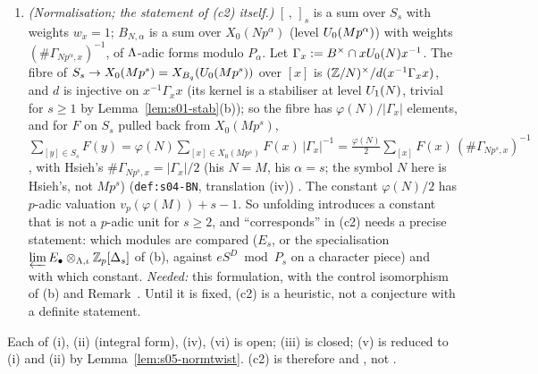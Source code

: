 \begin{remark}
\begin{enumerate}[label=(\roman*)]
  $\langle\varepsilon_{\rm cyc}(\Nrd x)\rangle^{-2}\langle\varepsilon_{\rm cyc}(\Nrd x)\rangle_{\mathbb I}$ is not covered at finite level (it is a $\Lam$-adic character, see (ii)).
  Consistency check, \stproved{} (after $\otimes\bar\Q_p$, where the diamond characters split $E_s$): $u_s(\langle d\rangle x,y)=u_s(x,\langle d\rangle^{-1}y)$ ((R2), and
  $\langle d\rangle^\Ros=w\langle d\rangle w^{-1}=\langle d\rangle^{-1}$ by Lemma~\ref{lem:s05-R1}(a) and Atkin--Li Prop.~1.1, Step~3 there), so $u_s$ pairs the
  $\varepsilon$-piece with the $\varepsilon^{-1}$-piece; $w$ exchanges them and $U_p^{-s}$ preserves them, so $[\,,\,]_s$ pairs each $\varepsilon$-piece with
  itself, as $B_N$ pairs $eS^D(N,\chi,\mathbb I)$ with itself; on the Brandt side, $\langle\xi,t_\chi\eta\rangle$ pairs $A[S_s]^{\chi^{-1}}$ with itself.
\item \emph{(Normalisation; the statement of (c2) itself.)} $[\,,\,]_s$ is a sum over $S_s$ with weights $w_x=1$; $B_{N,\alpha}$ is a sum over
  $X_0(Np^\alpha)$ (level $U_0(Mp^\alpha)$) with weights $(\#\Gamma_{Np^\alpha,x})^{-1}$, of $\Lam$-adic forms modulo $P_\alpha$. Let $\Gamma_x:=B^\times\cap xU_0(N)x^{-1}$. The fibre of $S_s\to X_0(Mp^s)=X_{B_q}(U_0(Mp^s))$ over $[x]$ is
  $(\mathbb{Z}/N)^\times/d(x^{-1}\Gamma_xx)$, and $d$ is injective on $x^{-1}\Gamma_xx$ (its kernel is a stabiliser at level $U_1(N)$, trivial for $s\ge1$ by
  Lemma~\ref{lem:s01-stab}(b)); so the fibre has $\varphi(N)/|\Gamma_x|$ elements, and for $F$ on $S_s$ pulled back from $X_0(Mp^s)$,
  $\sum_{[y]\in S_s}F(y)=\varphi(N)\sum_{[x]\in X_0(Mp^s)}F(x)\,|\Gamma_x|^{-1}=\tfrac{\varphi(N)}2\sum_{[x]}F(x)\,(\#\Gamma_{Np^s,x})^{-1}$, with Hsieh's
  $\#\Gamma_{Np^s,x}=|\Gamma_x|/2$ (his $N=M$, his $\alpha=s$; the symbol $N$ here is Hsieh's, not $Mp^s$) (\texttt{def:s04-BN}, translation (iv)) \stproved. The constant $\varphi(N)/2$ has $p$-adic valuation $v_p(\varphi(M))+s-1$. So unfolding
  introduces a constant that is not a $p$-adic unit for $s\ge2$, and ``corresponds'' in (c2) needs a precise
  statement: which modules are compared ($E_s$, or the specialisation $\varprojlim E_\bullet\otimes_{\Lambda,\iota}\mathbb{Z}_p[\Delta_s]$ of (b), against $eS^D\bmod P_s$ on a
  character piece) and with which constant. \emph{Needed:} this formulation, with the control isomorphism of (b) and Remark~. Until it is
  fixed, (c2) is a heuristic, not a conjecture with a definite statement.
\end{enumerate}
Each of (i), (ii) (integral form), (iv), (vi) is open; (iii) is closed; (v) is reduced to (i) and (ii) by Lemma~\ref{lem:s05-normtwist}. (c2) is
therefore \stconj{} and \stopen, not \stsketch.
\end{remark}

